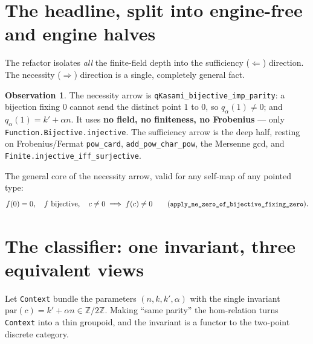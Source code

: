 \documentclass[11pt]{article}
\newcommand{\lst}[1]{{\small\texttt{#1}}}
\newcommand{\Zmod}{\mathbb{Z}/2\mathbb{Z}}
\theoremstyle{definition}
\newtheorem*{obs}{Observation}
\begin{document}
\section{The headline, split into engine-free and engine halves}

The refactor isolates \emph{all} the finite-field depth into the sufficiency
($\Leftarrow$) direction. The necessity ($\Rightarrow$) direction is a single,
completely general fact.

\begin{center}
\end{center}

\begin{obs}
The necessity arrow is
\lst{qKasami\_bijective\_imp\_parity}: a bijection fixing $0$ cannot send the
distinct point $1$ to $0$, so $q_\alpha(1)\neq 0$; and $q_\alpha(1)=k'+\alpha n$.
It uses \textbf{no field, no finiteness, no Frobenius} --- only
\lst{Function.Bijective.injective}. The sufficiency arrow is the deep half,
resting on Frobenius/Fermat \lst{pow\_card}, \lst{add\_pow\_char\_pow}, the
Mersenne gcd, and \lst{Finite.injective\_iff\_surjective}.
\end{obs}

\noindent The general core of the necessity arrow, valid for any self-map of any
pointed type:
\[
  f(0)=0,\quad f \text{ bijective},\quad c\neq 0 \;\Longrightarrow\; f(c)\neq 0
  \qquad(\text{\lst{apply\_ne\_zero\_of\_bijective\_fixing\_zero}}).
\]

\section{The classifier: one invariant, three equivalent views}

Let \lst{Context} bundle the parameters $(n,k,k',\alpha)$ with the single
invariant $\mathrm{par}(c) = k'+\alpha n \in \Zmod$. Making ``same parity'' the
hom-relation turns \lst{Context} into a thin groupoid, and the invariant is a
functor to the two-point discrete category.

\begin{center}
\end{center}
\end{document}
